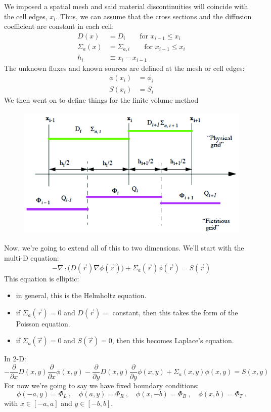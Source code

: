 \documentclass[12pt]{article}
\begin{document}
We imposed a spatial mesh and said material discontinuities will coincide with the cell edges, $x_i$. Thus, we can assume that the cross sections and the diffusion coefficient are constant in each cell:
%
\begin{align}
D(x) &= D_i \qquad \text{for } x_{i-1} \leq x_i \nonumber \\
\Sigma_{a}(x) &= \Sigma_{a,i} \qquad \text{for } x_{i-1} \leq x_i \nonumber \\
h_i &\equiv x_i - x_{i-1} \nonumber 
\end{align}
%
The unknown fluxes and known sources are defined at the mesh or cell edges:
\begin{align}
\phi(x_i) &= \phi_i \nonumber \\
S(x_i) &= S_i \nonumber 
\end{align}
%
We then went on to define things for the finite volume method
\begin{center}
\begin{figure}[h!]
\includegraphics[height=2.5in]{FVM-DE}
\end{figure}
\end{center}

Now, we're going to extend all of this to two dimensions. We'll start with the multi-D equation:
\[-\nabla \cdot \bigl(D(\vec{r})\nabla \phi(\vec{r})\bigr) + \Sigma_a(\vec{r}) \phi(\vec{r}) = S(\vec{r})\]
%
This equation is elliptic:
\begin{itemize}
\item in general, this is the Helmholtz equation.
\item if $\Sigma_a(\vec{r})=0$ and $D(\vec{r})=$ constant, then this takes the form of the Poisson equation.
\item if $\Sigma_a(\vec{r})=0$ and $S(\vec{r})=0$, then this becomes Laplace's equation. 
\end{itemize}

In 2-D:
\[-\frac{\partial}{\partial x}D(x,y)\frac{\partial}{\partial x} \phi(x,y) -\frac{\partial}{\partial y}D(x,y)\frac{\partial}{\partial y} \phi(x,y) + \Sigma_a(x,y) \phi(x,y) = S(x,y)\]
%
For now we're going to say we have fixed boundary conditions:
\[\phi(-a,y) = \Phi_L\:, \quad \phi(a,y) = \Phi_R\:, \quad \phi(x,-b) = \Phi_B\:, \quad \phi(x,b) = \Phi_T\:.\]
with $x \in [-a,a]$ and $y \in [-b,b]$.
\end{document}
